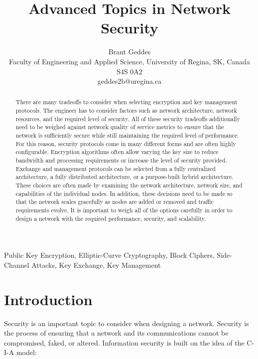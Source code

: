 \documentclass[journal]{IEEEtran}
\begin{document}
\title{Advanced Topics in Network Security}

\author{
Brant Geddes\\
Faculty of Engineering and Applied Science, University of Regina, SK, Canada S4S 0A2\\
geddes2b@uregina.ca
}

\maketitle

\begin{abstract}
There are many tradeoffs to consider when selecting encryption and key management protocols. The engineer has to consider factors such as network architecture, network resources, and the required level of security. All of these security tradeoffs additionally need to be weighed against network quality of service metrics to ensure that the network is sufficiently secure while still maintaining the required level of performance. For this reason, security protocols come in many different forms and are often highly configurable. Encryption algorithms often allow varying the key size to reduce bandwidth and processing requirements or increase the level of security provided. Exchange and management protocols can be selected from a fully centralized architecture, a fully distributed architecture, or a purpose-built hybrid architecture. These choices are often made by examining the network architecture, network size, and capabilities of the individual nodes. In addition, these decisions need to be made so that the network scales gracefully as nodes are added or removed and traffic requirements evolve. It is important to weigh all of the options carefully in order to design a network with the required performance, security, and scalability.
\end{abstract}

\begin{IEEEkeywords}
        Public Key Encryption, Elliptic-Curve Cryptography, Block Ciphers, Side-Channel Attacks, Key Exchange, Key Management
\end{IEEEkeywords}

\section{Introduction}
Security is an important topic to consider when designing a network. Security is the process of ensuring that a network and its communications cannot be compromised, faked, or altered. Information security is built on the idea of the C-I-A model:
\end{document}
